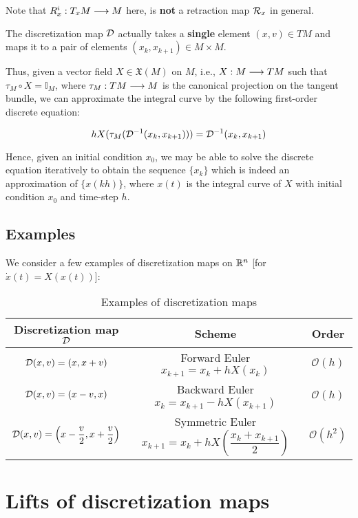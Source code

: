 \begin{rmk}
  Note that $R^i_x : T_x M \lra M$ here, is \textbf{not} a retraction map $\Ret_x$ in general.
\end{rmk}

\begin{rmk}
  The discretization map $\D$ actually takes a \textbf{single} element $(x,v) \in TM$ and maps it to a pair of elements $(x_k , x_{k+1}) \in M \times M$.
\end{rmk}

Thus, given a vector field $X \in \mathfrak{X}(M)$ on $M$, i.e., $X: M \lra TM$ such that $\tau_M \circ X = \mathbb{I}_M$, where $\tau_M: TM \lra M$ is the canonical projection on the tangent bundle, we can approximate the integral curve by the following first-order discrete equation:

\[
  h X(\tau_M(\D^{-1}(x_k, x_{k+1}))) = \D^{-1}(x_k, x_{k+1})
\]

Hence, given an initial condition $x_0$, we may be able to solve the discrete equation iteratively to obtain the sequence $\{x_k\}$ which is indeed an approximation of $\{x(kh)\}$, where $x(t)$ is the integral curve of $X$ with initial condition $x_0$ and time-step $h$.

\subsection{Examples}
We consider a few examples of discretization maps on $\R[n]$ [for $\dot{x}(t) = X(x(t))$]:

\begin{table}[h]
\centering
\begin{tabular}{|c|c|c|}
\hline
 Discretization map $\D$ & Scheme & Order \\
\hline
 $\D(x,v) = (x, x + v)$ & Forward Euler $x_{k+1} = x_k + hX(x_k)$ & $\mathcal{O}(h)$ \\
 $\D(x,v) = (x - v, x)$ & Backward Euler $x_k = x_{k+1} - hX(x_{k+1})$ & $\mathcal{O}(h)$\\
 $\D(x, v) = \left(x - \dfrac{v}{2}, x + \dfrac{v}{2} \right)$ & Symmetric Euler $x_{k+1} = x_k + hX\left( \dfrac{x_k + x_{k+1}}{2}\right)$ & $\mathcal{O}(h^2)$\\
\hline
\end{tabular}
\caption{Examples of discretization maps}
\end{table}


\section{Lifts of discretization maps}

